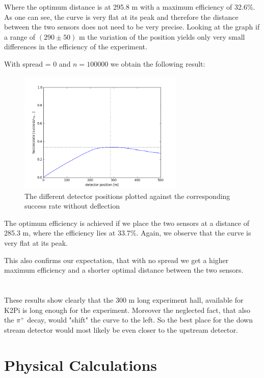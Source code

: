 \documentclass[a4paper,parskip,11pt, DIV12]{scrreprt}
\begin{document}
Where the optimum distance is at 295.8 m with a maximum efficiency of 32.6\%. As one can see, the curve is very flat at its peak and therefore the distance between the two sensors does not need to be very precise. Looking at the graph if a range of $(290 \pm 50)$ m the variation of the position yields only very small differences in the efficiency of the experiment.

With spread = 0 and $n = 100000$ we obtain the following result:

\begin{figure}[h] 
\centering
\includegraphics[width=0.7\textwidth]{Simulation100kNoSpread.png} 
\caption{The different detector positions plotted against the corresponding success rate without deflection}   
\end{figure}

The optimum efficiency is achieved if we place the two sensors at a distance of 285.3 m, where the efficiency lies at 33.7\%. Again, we observe that the curve is very flat at its peak. 

This also confirms our expectation, that with no spread we get a higher maximum efficiency and a shorter optimal distance between the two sensors.
\\
\\
\\
These results show clearly that the 300 m long experiment hall, available for K2Pi is long enough for the experiment. Moreover the neglected fact, that also the $\pi^+$ decay, would "shift" the curve to the left. So the best place for the down stream detector would most likely be even closer to the upstream detector. 
\clearpage

\chapter{Physical Calculations}
\end{document}
